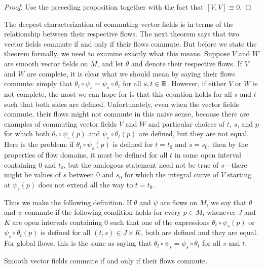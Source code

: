 \begin{proof}
Use the preceding proposition together with the fact that $[V,V]\equiv 0$.
\end{proof}
The deepest characterization of commuting vector fields is in terms of the relationship between their respective flows. The next theorem says that two vector fields
commute if and only if their flows commute. But before we state the theorem formally, we need to examine exactly what this means. Suppose $V$ and $W$ are smooth vector fields on $M$, and let $\theta$ and denote their respective flows. If $V$ and $W$ are complete, it is clear what we should mean by saying their flows commute: simply that $\theta_t\circ\psi_s=\psi_s\circ\theta_t$ for all $s,t\in\mathbb{R}$. However, if either $V$ or $W$ is not complete, the most we can hope for is that this equation holds for all $s$ and $t$ such that both sides are defined. Unfortunately, even when the vector fields commute, their flows might not commute in this naive sense, because there are examples of commuting vector fields $V$ and $W$ and particular choices of $t$, $s$, and $p$ for which both $\theta_t\circ\psi_s(p)$ and $\psi_s\circ\theta_t(p)$ are defined, but they are not equal. Here is the problem: if $\theta_t\circ\psi_s(p)$ is defined for $t=t_0$ and $s=s_0$, then by the properties of flow domains, it must be defined for all $t$ in some open interval containing $0$ and $t_0$, but the analogous statement need not be true of $s$---there might be values of $s$ between $0$ and $s_0$ for which the integral curve of $V$ starting at $\psi_s(p)$ does not extend all the way to $t=t_0$.\par
Thus we make the following definition. If $\theta$ and $\psi$ are flows on $M$, we say that $\theta$ and $\psi$ commute if the following condition holds for every $p\in M$, whenever $J$ and $K$ are open intervals containing $0$ such that one of the expressions $\theta_t\circ\psi_s(p)$ or $\psi_s\circ\theta_t(p)$ is defined for all $(t,s)\in J\times K$, both are defined and they are equal. For global flows, this is the same as saying that $\theta_t\circ\psi_s=\psi_s\circ\theta_t$ for all $s$ and $t$.
\begin{theorem}\label{vector filed commute flow}
Smooth vector fields commute if and only if their flows commute.
\end{theorem}
